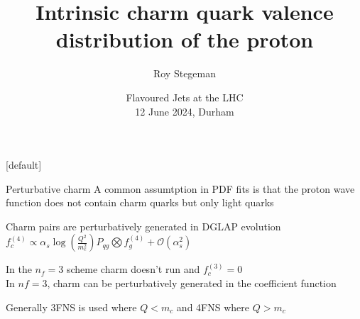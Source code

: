 \documentclass[aspectratio=43, 8pt,t]{beamer}
\title{Intrinsic charm quark valence distribution of the proton}
\date{Flavoured Jets at the LHC  \\[0.1cm] 12 June 2024, Durham}
\author{Roy Stegeman}
\institute{\small The University of Edinburgh}
\begin{document}
{
\begin{frame}
  \titlepage
\end{frame}
}

[default]



\newcommand{\nn}{\vspace*{1em}}






\begin{frame}{Perturbative charm}
  A common assumtption in PDF fits is that the proton wave function does not contain charm quarks but only light quarks

  \vspace*{1em}
  Charm pairs are perturbatively generated in DGLAP evolution\\
  $f_c^{(4)}\propto \alpha_s \log\left(\frac{Q^2}{m_c^2}\right)P_{qg} \bigotimes f_g^{(4)} + \mathcal{O}(\alpha_s^2)$

  \vspace*{1em}
  In the $n_f=3$ scheme charm doesn't run and $f_c^{(3)}=0$ \\
  In $nf=3$, charm can be perturbatively generated in the coefficient function

  \vspace*{1em}
  Generally 3FNS is used where $Q<m_c$ and 4FNS where $Q>m_c$


  \vspace*{1em}
\end{frame}
\end{document}
